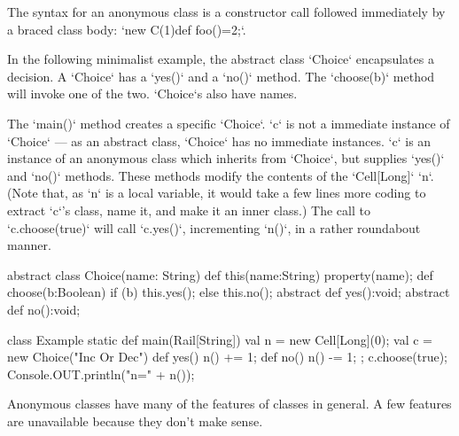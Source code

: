 The syntax for an anonymous class is a constructor call followed immediately
by a braced class body: \xcd`new C(1){def foo()=2;}`.

\begin{ex}In the following minimalist example, the abstract class \xcd`Choice`
encapsulates a decision.   A \xcd`Choice` has a \xcd`yes()` and a \xcd`no()`
method.  The \xcd`choose(b)` method will invoke one of the two.  \xcd`Choice`s
also have names.

The \xcd`main()` method creates a specific \xcd`Choice`.  \xcd`c` is not a
immediate instance of \xcd`Choice` --- as an abstract class, \xcd`Choice` has
no immediate instances. \xcd`c` is an instance of an anonymous class which
inherits from \xcd`Choice`, but supplies \xcd`yes()` and \xcd`no()` methods.
These methods modify the contents of the \xcd`Cell[Long]` \xcd`n`.  (Note that,
as \xcd`n` is a local variable, it would take a few lines more coding to
extract \xcd`c`'s class, name it, and make it an inner class.)  The call to
\xcd`c.choose(true)`  will call \xcd`c.yes()`, incrementing \xcd`n()`, in a
rather roundabout manner.

\begin{xten}
abstract class Choice(name: String) {
  def this(name:String) {property(name);}
  def choose(b:Boolean) { 
     if (b) this.yes(); else this.no(); }
  abstract def yes():void;
  abstract def no():void;
}

class Example {
  static def main(Rail[String]) {
    val n = new Cell[Long](0);
    val c = new Choice("Inc Or Dec") {
      def yes() { n() += 1; }
      def no()  { n() -= 1; }
      };
    c.choose(true);
    Console.OUT.println("n=" + n());
  }
}

\end{xten}
%
\end{ex}

Anonymous classes have many of the features of classes in general.  A few
features are unavailable because they don't make sense.

